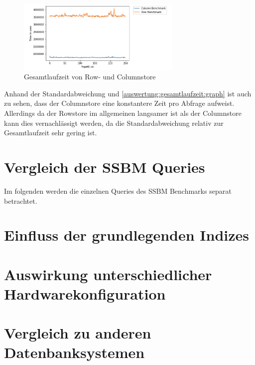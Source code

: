 \begin{figure}[H]
	\centering
	\includegraphics[width=0.7\textwidth]{images/performanceentwicklung.png}
	\caption{Gesamtlaufzeit von Row- und Columnstore}\label{auswertung:gesamtlaufzeit:graph}
\end{figure}
Anhand der Standardabweichung und \autoref{auswertung:gesamtlaufzeit:graph} ist auch zu sehen, dass der Columnstore
eine konstantere Zeit pro Abfrage aufweist.
Allerdings da der Rowstore im allgemeinen langsamer ist als der Columnstore
kann dies vernachlässigt werden, da die Standardabweichung relativ zur
Gesamtlaufzeit sehr gering ist.

\section{Vergleich der SSBM Queries}\label{auswertung:queries}

Im folgenden werden die einzelnen Queries des SSBM Benchmarks separat betrachtet.



\section{Einfluss der grundlegenden Indizes}\label{auswertung:basic_indizes}


\section{Auswirkung unterschiedlicher Hardwarekonfiguration}\label{auswertung:hardware}


\section{Vergleich zu anderen Datenbanksystemen}\label{auswertung:vergleich}


